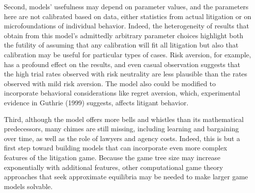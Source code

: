 \documentclass{article}
\begin{document}
Second, models' usefulness may depend on parameter values, and the parameters here are not calibrated based on data, either statistics from actual litigation or on microfoundations of individual behavior. Indeed, the heterogeneity of results that obtain from this model's admittedly arbitrary parameter choices highlight both the futility of assuming that any calibration will fit all litigation but also that calibration may be useful for particular types of cases. Risk aversion, for example, has a profound effect on the results, and even casual observation suggests that the high trial rates observed with risk neutrality are less plausible than the rates observed with mild risk aversion. The model also could be modified to incorporate behavioral considerations like regret aversion, which, experimental evidence in Guthrie (1999) \cite{guthrie} suggests, affects litigant behavior.

Third, although the model offers more bells and whistles than its mathematical predecessors, many chimes are still missing, including learning and bargaining over time, as well as the role of lawyers and agency costs. Indeed, this is but a first step toward building models that can incorporate even more complex features of the litigation game. Because the game tree size may increase exponentially with additional features, other computational game theory approaches that seek approximate equilibria may be needed to make larger game models solvable. 

\printbibliography
\end{document}

